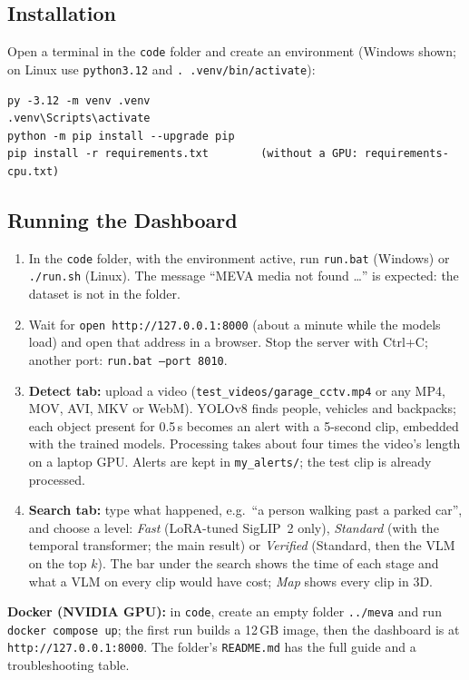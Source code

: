 \documentclass[11pt,a4paper]{article}
\begin{document}
\subsection{Installation}
Open a terminal in the \texttt{code} folder and create an environment (Windows shown; on Linux use
\texttt{python3.12} and \texttt{. .venv/bin/activate}):
\begin{lstlisting}[language={},numbers=none]
py -3.12 -m venv .venv
.venv\Scripts\activate
python -m pip install --upgrade pip
pip install -r requirements.txt        (without a GPU: requirements-cpu.txt)
\end{lstlisting}

\subsection{Running the Dashboard}
\begin{enumerate}[leftmargin=*]
  \item In the \texttt{code} folder, with the environment active, run \texttt{run.bat} (Windows) or
        \texttt{./run.sh} (Linux). The message ``MEVA media not found \ldots'' is expected: the dataset is not in
        the folder.
  \item Wait for \texttt{open http://127.0.0.1:8000} (about a minute while the models load) and open that address
        in a browser. Stop the server with Ctrl+C; another port: \texttt{run.bat --port 8010}.
  \item \textbf{Detect tab:} upload a video (\texttt{test\_videos/garage\_cctv.mp4} or any MP4, MOV, AVI, MKV or
        WebM). YOLOv8 finds people, vehicles and backpacks; each object present for 0.5\,s becomes an alert with
        a 5-second clip, embedded with the trained models. Processing takes about four times the video's length
        on a laptop GPU. Alerts are kept in \texttt{my\_alerts/}; the test clip is already processed.
  \item \textbf{Search tab:} type what happened, e.g.\ ``a person walking past a parked car'', and choose a level:
        \emph{Fast} (LoRA-tuned SigLIP~2 only), \emph{Standard} (with the temporal transformer; the main result)
        or \emph{Verified} (Standard, then the VLM on the top $k$). The bar under the search shows the time of
        each stage and what a VLM on every clip would have cost; \emph{Map} shows every clip in 3D.
\end{enumerate}
\textbf{Docker (NVIDIA GPU):} in \texttt{code}, create an empty folder \texttt{../meva} and run
\texttt{docker compose up}; the first run builds a 12\,GB image, then the dashboard is at
\texttt{http://127.0.0.1:8000}. The folder's \texttt{README.md} has the full guide and a troubleshooting table.
\end{document}
